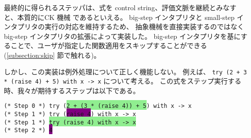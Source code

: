 最終的に得られるステッパは、式を control string、評価文脈を継続とみなすと、本質的にCK 機械 \cite{FF1986} であるといえる。
big-step インタプリタと small-step インタプリタの実行の対応を維持するため、
抽象機械を直接実装するのではなく big-step インタプリタの拡張によって実装した。
big-step インタプリタを基にすることで、ユーザが指定した関数適用をスキップすることができる
(\ref{subsection:skip} 節で触れる)。

しかし、この実装は例外処理について正しく機能しない。
例えば、 \texttt{try (2 + 3 * (raise 4) + 5) with x -> x} について考える。
この式をステップ実行する時、我々が期待するステップは以下である。

\vspace{0.2cm}

\noindent \texttt{(* Step 0 *) try (\colorbox{lightgreen}{2 + (3 * (raise 4)) + 5}) with x -> x\\
  (* Step 1 *) try (\colorbox{purple}{raise 4}) with x -> x\\
  (* Step 1 *) \colorbox{lightgreen}{try (raise 4) with x -> x}\\
  (* Step 2 *) \colorbox{purple}{4}\\
}

\vspace{0.2cm}

